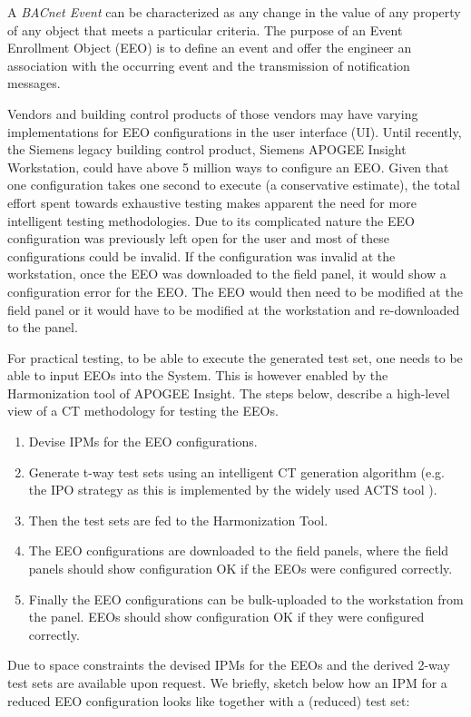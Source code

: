 \documentclass[runningheads]{llncs}
\newcommand{\apogee}{APOGEE Insight\textsuperscript{\tiny{\textregistered}}}
\begin{document}
 A \emph{BACnet Event} can be characterized as any change in the value of any property of any object
that meets a particular criteria. The purpose of an Event Enrollment Object (EEO) is to define an
event and offer the engineer an association with the occurring event and the transmission of notification messages.

Vendors and building control products of those vendors may have varying implementations
for EEO configurations in the user interface (UI). Until recently, the Siemens legacy building control product,
Siemens \apogee{} Workstation, could have above 5 million ways to configure an EEO.
Given that one configuration takes one second to execute (a conservative estimate), the total effort spent towards exhaustive testing makes apparent the need for more intelligent testing methodologies.
Due to its complicated nature the EEO configuration was previously left open for the user and most of these configurations
could be invalid. If the configuration was invalid at the workstation, once the EEO was downloaded to the field panel,
it would show a configuration error for the EEO. The EEO would then need to be modified at the field panel or
it would have to be modified at the workstation and re-downloaded to the panel.

For practical testing, to be able to execute the generated test set,
one needs to be able to input EEOs into the System.
This is however enabled by the Harmonization tool of \apogee{}.
The steps below, describe a high-level view of a CT methodology for testing the EEOs.
    \begin{enumerate}
        \item Devise IPMs for the EEO configurations.
        \item Generate t-way test sets using an intelligent CT generation algorithm (e.g. the IPO strategy as this is implemented by the widely used ACTS tool \cite{ACTS-tool}).
        \item Then the test sets are fed to the Harmonization Tool.
        \item The EEO configurations are downloaded to the field panels, where the field
        panels should show configuration OK if the EEOs were configured correctly.
        \item Finally the EEO configurations can be bulk-uploaded to the workstation from the panel.
        EEOs should show configuration OK if they were configured correctly.
    \end{enumerate}

Due to space constraints the devised IPMs for the EEOs and the derived 2-way test sets are available upon request.
We briefly, sketch below how an IPM for a reduced EEO configuration looks like together with a (reduced) test set:
\end{document}
